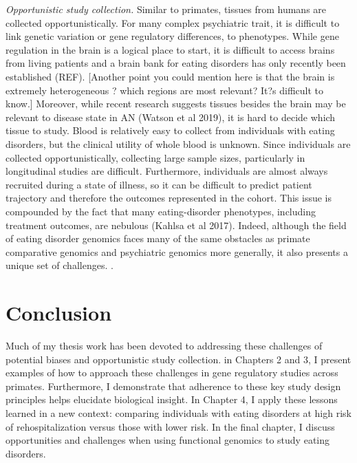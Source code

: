\textit{Opportunistic study collection.}
Similar to primates, tissues from humans are collected opportunistically. For many complex psychiatric trait, it is difficult to link genetic variation or gene regulatory differences, to phenotypes. While gene regulation in the brain is a logical place to start, it is difficult to access brains from living patients and a brain bank for eating disorders has only recently been established (REF).  [Another point you could mention here is that the brain is extremely heterogeneous ? which regions are most relevant? It?s difficult to know.] Moreover, while recent research suggests tissues besides the brain may be relevant to disease state in AN (Watson et al 2019), it is hard to decide which tissue to study. Blood is relatively easy to collect from individuals with eating disorders, but the clinical utility of whole blood is unknown. 
Since individuals are collected opportunistically, collecting large sample sizes, particularly in longitudinal studies are difficult. Furthermore, individuals are almost always recruited during a state of illness, so it can be difficult to predict patient trajectory and therefore the outcomes represented in the cohort. This issue is compounded by the fact that many eating-disorder phenotypes, including treatment outcomes, are nebulous (Kahlsa et al 2017). Indeed, although the field of eating disorder genomics faces many of the same obstacles as primate comparative genomics and psychiatric genomics more generally, it also presents a unique set of challenges. .

\section{Conclusion}
Much of my thesis work has been devoted to addressing these challenges of potential biases and opportunistic study collection. in Chapters 2 and 3, I present examples of how to approach these challenges in gene regulatory studies across primates. Furthermore, I demonstrate that adherence to these key study design principles helps elucidate biological insight. In Chapter 4, I apply these lessons learned in a new context: comparing individuals with eating disorders at high risk of rehospitalization versus those with lower risk. In the final chapter, I discuss opportunities and challenges when using functional genomics to study eating disorders. 
